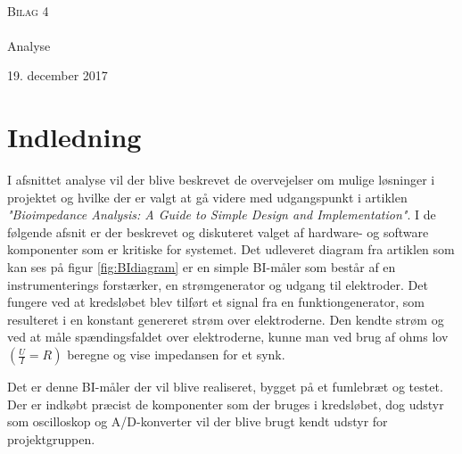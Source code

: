 



\begin{titlingpage}
\begin{center}

~ \\[3cm]


\textsc{\LARGE Bilag 4}\\[1.5cm]


\noindent\makebox[\linewidth]{\rule{\textwidth}{0.4pt}}\\
[0.5cm]{\Huge Analyse}
\noindent\makebox[\linewidth]{\rule{\textwidth}{0.4pt}}
\end{center}
\vfill
\begin{center}
{\large 19. december 2017}
\end{center}
\end{titlingpage}

\newpage
\tableofcontents*
\newpage


\chapter{Indledning}

I afsnittet analyse vil der blive beskrevet de overvejelser om mulige løsninger i projektet og hvilke der er valgt at gå videre med udgangspunkt i artiklen \textit{"Bioimpedance Analysis: A Guide to Simple Design and Implementation"}. I de følgende afsnit er der beskrevet og diskuteret valget af hardware- og software komponenter som er kritiske for systemet. Det udleveret diagram fra artiklen som kan ses på figur \ref{fig:BIdiagram} er en simple BI-måler som består af en instrumenterings forstærker, en strømgenerator og udgang til elektroder. Det fungere ved at kredsløbet blev tilført et signal fra en funktiongenerator, som resulteret i en konstant genereret strøm over elektroderne. Den kendte strøm og ved at måle spændingsfaldet over elektroderne, kunne man ved brug af ohms lov $(\frac{U}{I}=R)$ beregne og vise impedansen for et synk.

Det er denne BI-måler der vil blive realiseret, bygget på et fumlebræt og testet. Der er indkøbt præcist de komponenter som der bruges i kredsløbet, dog udstyr som oscilloskop og A/D-konverter vil der blive brugt kendt udstyr for projektgruppen. 






